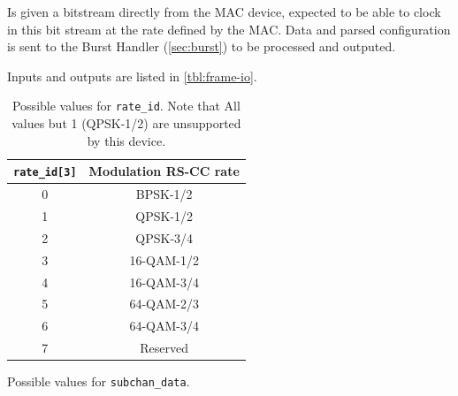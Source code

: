 \documentclass[dvips,10pt,twocolumn]{article}
\newcommand{\wire}{\texttt}
\begin{document}
Is given a bitstream directly from the MAC device, expected to be able to
clock in this bit stream at the rate defined by the MAC. Data and
parsed configuration is sent to the Burst Handler (\autoref{sec:burst})
to be processed and outputed.

Inputs and outputs are listed in \autoref{tbl:frame-io}.

\begin{table} \begin{center} \begin{tabularx}{\linewidth}{c|c}
	\label{tbl:rate-id}
	\wire{rate\_id[3]} & Modulation RS-CC rate \\ \hline
	0 & BPSK-1/2 \\
	1 & QPSK-1/2 \\
	2 & QPSK-3/4 \\
	3 & 16-QAM-1/2 \\
	4 & 16-QAM-3/4 \\
	5 & 64-QAM-2/3 \\
	6 & 64-QAM-3/4 \\
	7 & Reserved
\end{tabularx} \caption{Possible values for \wire{rate\_id}. Note that
All values but 1 (QPSK-1/2) are unsupported by this device.}
\end{center} \end{table}

\begin{table}
	\label{tbl:subchan}
	
	\caption{Possible values for \wire{subchan\_data}.}
\end{table}
\end{document}
